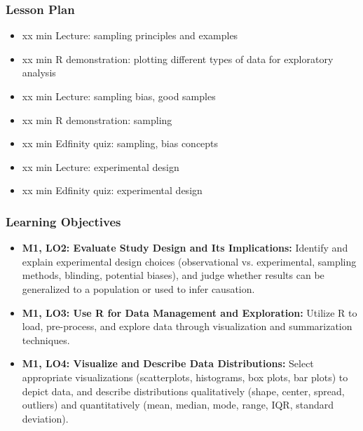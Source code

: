 \begin{frame}
    \frametitle{Lesson Plan}
    \begin{itemize}
        \item xx min Lecture: sampling principles and examples
        \item xx min R demonstration: plotting different types of data for exploratory analysis
        \item xx min Lecture: sampling bias, good samples
        \item xx min R demonstration: sampling
        \item xx min Edfinity quiz: sampling, bias concepts
        \item xx min Lecture: experimental design
        \item xx min Edfinity quiz: experimental design
    \end{itemize}
\end{frame}
    
\begin{frame}
    \frametitle{Learning Objectives}
    \begin{itemize}
        \item \textbf{M1, LO2: Evaluate Study Design and Its Implications:} Identify and explain experimental design choices (observational vs. experimental, sampling methods, blinding, potential biases), and judge whether results can be generalized to a population or used to infer causation. 
        \item \textbf{M1, LO3: Use R for Data Management and Exploration:} Utilize R to load, pre-process, and explore data through visualization and summarization techniques.
        \item \textbf{M1, LO4: Visualize and Describe Data Distributions:} Select appropriate visualizations (scatterplots, histograms, box plots, bar plots) to depict data, and describe distributions qualitatively (shape, center, spread, outliers) and quantitatively (mean, median, mode, range, IQR, standard deviation).
    \end{itemize}
\end{frame}

